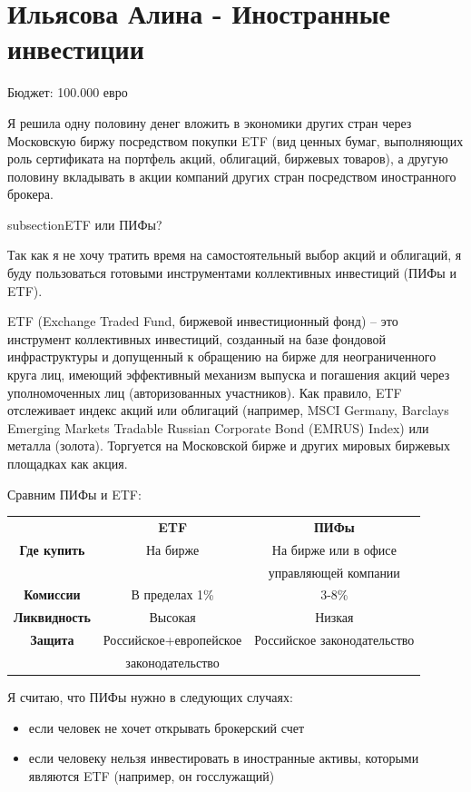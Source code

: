 \section{Ильясова Алина - Иностранные инвестиции}

Бюджет: 100.000 евро

Я решила одну половину денег вложить в экономики других стран через Московскую биржу посредством покупки ETF (вид ценных бумаг, выполняющих роль сертификата на портфель акций, облигаций, биржевых товаров), а другую половину вкладывать в акции компаний других стран посредством иностранного брокера.

subsection{ETF или ПИФы?}

Так как я не хочу тратить время на самостоятельный выбор акций и облигаций, я буду пользоваться готовыми инструментами коллективных инвестиций (ПИФы и ETF).

ETF (Exchange Traded Fund, биржевой инвестиционный фонд) – это инструмент коллективных инвестиций, созданный на базе фондовой инфраструктуры и допущенный к обращению на бирже для неограниченного круга лиц, имеющий эффективный механизм выпуска и погашения акций через уполномоченных лиц (авторизованных участников). Как правило, ETF отслеживает индекс акций или облигаций (например, MSCI Germany, Barclays Emerging Markets Tradable Russian Corporate Bond (EMRUS) Index) или металла (золота). Торгуется на Московской бирже и других мировых биржевых площадках как акция.

Сравним ПИФы и ETF:

\begin{center}
	\begin{tabular}{ccc}
	      & \textbf{ETF} & \textbf{ПИФы} \\
	      \textbf{Где купить} & На бирже & На бирже или в офисе \\
	       & & управляющей компании \\
	      \textbf{Комиссии} & В пределах 1\% & 3-8\% \\
	      \textbf{Ликвидность} & Высокая & Низкая \\
	      \textbf{Защита} & Российское+европейское & Российское законодательство \\
	       & законодательство & \\
	\end{tabular}
\end{center}

Я считаю, что ПИФы нужно в следующих случаях:
\begin{itemize}
	\item если человек не хочет открывать брокерский счет
	\item если человеку нельзя инвестировать в иностранные активы, которыми являются ETF (например, он госслужащий)
\end{itemize}

